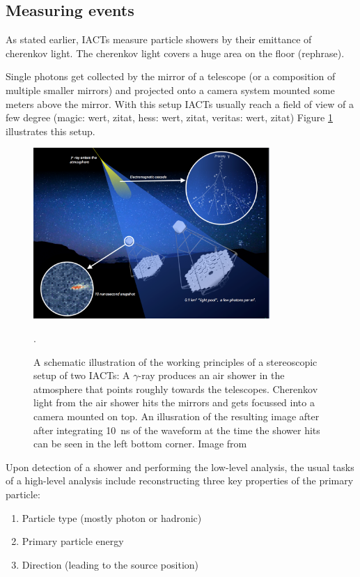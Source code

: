 \subsection{Measuring events}
As stated earlier, IACTs measure particle showers by their emittance of cherenkov 
light. The cherenkov light covers a huge area on the floor (rephrase).

Single photons get collected by the mirror of a telescope (or a composition of 
multiple smaller mirrors) and projected onto a camera system mounted some 
meters above the mirror.
With this setup IACTs usually reach a field of view of 
a few degree (magic: wert, zitat, hess: wert, zitat, veritas: wert, zitat)
Figure \ref{fig:iact_mirror_camera} illustrates this 
setup.


\begin{figure}
	\centering
	\includegraphics[width=0.8\textwidth]{images/cta47.png}
	\caption{A schematic illustration of the working principles of 
	a stereoscopic setup of two IACTs:
	A $\gamma$-ray produces an air shower in the atmosphere
	that points roughly towards the telescopes.
	Cherenkov light from the air shower 
	hits the mirrors and gets focussed into a camera mounted on top.
	An illusration of the resulting image after after integrating 
	\SI{10}{\nano\second} of the waveform at the time the shower hits
	can be seen in the left bottom corner.
	Image from \cite{cta_web}}.
	\label{fig:iact_mirror_camera}
\end{figure}


Upon detection of a shower and performing the low-level analysis,
the usual tasks of a high-level analysis include reconstructing 
three key properties of the primary particle:
\begin{enumerate}
	\item{Particle type (mostly photon or hadronic)}
	\item{Primary particle energy}
	\item{Direction (leading to the source position)}
\end{enumerate}

